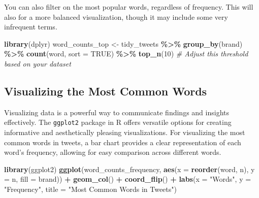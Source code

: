 \documentclass[
]{book}
\newenvironment{Shaded}{\begin{snugshade}}{\end{snugshade}}
\newcommand{\AttributeTok}[1]{\textcolor[rgb]{0.13,0.29,0.53}{#1}}
\newcommand{\CommentTok}[1]{\textcolor[rgb]{0.56,0.35,0.01}{\textit{#1}}}
\newcommand{\ConstantTok}[1]{\textcolor[rgb]{0.56,0.35,0.01}{#1}}
\newcommand{\DecValTok}[1]{\textcolor[rgb]{0.00,0.00,0.81}{#1}}
\newcommand{\FunctionTok}[1]{\textcolor[rgb]{0.13,0.29,0.53}{\textbf{#1}}}
\newcommand{\NormalTok}[1]{#1}
\newcommand{\OtherTok}[1]{\textcolor[rgb]{0.56,0.35,0.01}{#1}}
\newcommand{\SpecialCharTok}[1]{\textcolor[rgb]{0.81,0.36,0.00}{\textbf{#1}}}
\newcommand{\StringTok}[1]{\textcolor[rgb]{0.31,0.60,0.02}{#1}}
\begin{document}
You can also filter on the most popular words, regardless of frequency. This will also for a more balanced visualization, though it may include some very infrequent terms.

\begin{Shaded}
\begin{Highlighting}[]
\FunctionTok{library}\NormalTok{(dplyr)}
\NormalTok{word\_counts\_top }\OtherTok{\textless{}{-}}\NormalTok{ tidy\_tweets }\SpecialCharTok{\%\textgreater{}\%}
  \FunctionTok{group\_by}\NormalTok{(brand) }\SpecialCharTok{\%\textgreater{}\%}
  \FunctionTok{count}\NormalTok{(word, }\AttributeTok{sort =} \ConstantTok{TRUE}\NormalTok{) }\SpecialCharTok{\%\textgreater{}\%}
  \FunctionTok{top\_n}\NormalTok{(}\DecValTok{10}\NormalTok{) }\CommentTok{\# Adjust this threshold based on your dataset}
\end{Highlighting}
\end{Shaded}

\hypertarget{visualizing-the-most-common-words}{%
\subsection{Visualizing the Most Common Words}\label{visualizing-the-most-common-words}}

Visualizing data is a powerful way to communicate findings and insights effectively. The \texttt{ggplot2} package in R offers versatile options for creating informative and aesthetically pleasing visualizations. For visualizing the most common words in tweets, a bar chart provides a clear representation of each word's frequency, allowing for easy comparison across different words.

\begin{Shaded}
\begin{Highlighting}[]
\FunctionTok{library}\NormalTok{(ggplot2)}
\FunctionTok{ggplot}\NormalTok{(word\_counts\_frequency, }\FunctionTok{aes}\NormalTok{(}\AttributeTok{x =} \FunctionTok{reorder}\NormalTok{(word, n), }\AttributeTok{y =}\NormalTok{ n, }\AttributeTok{fill =}\NormalTok{ brand)) }\SpecialCharTok{+}
  \FunctionTok{geom\_col}\NormalTok{() }\SpecialCharTok{+}
  \FunctionTok{coord\_flip}\NormalTok{() }\SpecialCharTok{+}
  \FunctionTok{labs}\NormalTok{(}\AttributeTok{x =} \StringTok{"Words"}\NormalTok{, }\AttributeTok{y =} \StringTok{"Frequency"}\NormalTok{, }\AttributeTok{title =} \StringTok{"Most Common Words in Tweets"}\NormalTok{)}
\end{Highlighting}
\end{Shaded}
\end{document}
